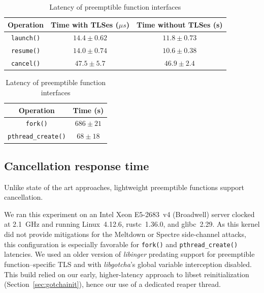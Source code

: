 \begin{table}
	\begin{minipage}{\textwidth}
	\centering
	\begin{tabular}{c | c c}
	Operation & Time with TLSes ($\mu{s}$) & Time without TLSes (\textmu{}s) \\
	\hline
	\texttt{launch()} & $14.4 \pm 0.62$ & $11.8 \pm 0.73$ \\
	\texttt{resume()} & $14.0 \pm 0.74$ & $10.6 \pm 0.38$ \\
	\texttt{cancel()} & $47.5 \pm 5.7$ & $46.9 \pm 2.4$ \\
	\end{tabular}
	\end{minipage}

	\begin{minipage}{\textwidth}
	\vspace{12pt}
	\centering
	\begin{tabular}{c | c}
	Operation & Time (\textmu{}s) \\
	\hline
	\texttt{fork()} & $686 \pm 21$ \\
	\texttt{pthread\_create()} & \;\;$68 \pm 18$
	\end{tabular}
	\end{minipage}
\caption{Latency of preemptible function interfaces}
\label{tab:libinger}
\end{table}


\subsection{Cancellation response time}
\label{sec:libinger:bombs}

Unlike state of the art approaches, lightweight preemptible functions support
cancellation.

\begin{sloppypar}

\end{sloppypar}

We ran this experiment on an Intel Xeon E5-2683~v4 (Broadwell) server clocked at
2.1~GHz and running Linux~4.12.6, rustc~1.36.0, and glibc~2.29.  As this kernel did
not provide mitigations for the Meltdown or Spectre side-channel attacks, this
configuration is especially favorable for \texttt{fork()} and
\texttt{pthread\_create()} latencies.  We used an older version of \textit{libinger}
predating support for preemptible function--specific TLS and with
\textit{libgotcha}'s global variable interception disabled.  This build relied on our
early, higher-latency approach to libset reinitialization
(Section~\ref{sec:gotchainit}), hence our use of a dedicated reaper thread.
